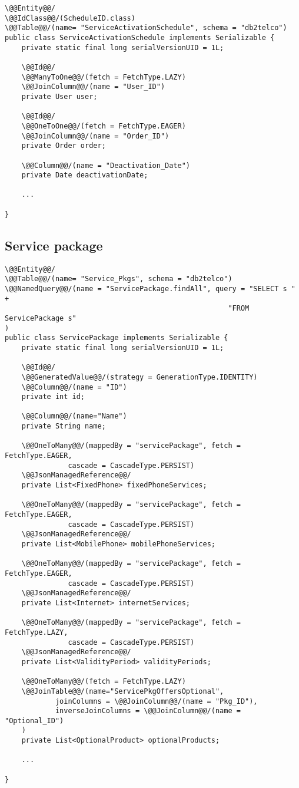 \begin{lstlisting}[style = JPA]
\@@Entity@@/
\@@IdClass@@/(ScheduleID.class)
\@@Table@@/(name= "ServiceActivationSchedule", schema = "db2telco")
public class ServiceActivationSchedule implements Serializable {
    private static final long serialVersionUID = 1L;

    \@@Id@@/
    \@@ManyToOne@@/(fetch = FetchType.LAZY)
    \@@JoinColumn@@/(name = "User_ID")
    private User user;

    \@@Id@@/
    \@@OneToOne@@/(fetch = FetchType.EAGER)
    \@@JoinColumn@@/(name = "Order_ID")
    private Order order;

    \@@Column@@/(name = "Deactivation_Date")
    private Date deactivationDate;
    
    ...

}
\end{lstlisting}

\subsection*{Service package}

\begin{lstlisting}[style = JPA]
\@@Entity@@/
\@@Table@@/(name= "Service_Pkgs", schema = "db2telco")
\@@NamedQuery@@/(name = "ServicePackage.findAll", query = "SELECT s " +
                                                     "FROM ServicePackage s"
)
public class ServicePackage implements Serializable {
    private static final long serialVersionUID = 1L;

    \@@Id@@/
    \@@GeneratedValue@@/(strategy = GenerationType.IDENTITY)
    \@@Column@@/(name = "ID")
    private int id;

    \@@Column@@/(name="Name")
    private String name;

    \@@OneToMany@@/(mappedBy = "servicePackage", fetch = FetchType.EAGER, 
               cascade = CascadeType.PERSIST)
    \@@JsonManagedReference@@/
    private List<FixedPhone> fixedPhoneServices;

    \@@OneToMany@@/(mappedBy = "servicePackage", fetch = FetchType.EAGER, 
               cascade = CascadeType.PERSIST)
    \@@JsonManagedReference@@/
    private List<MobilePhone> mobilePhoneServices;

    \@@OneToMany@@/(mappedBy = "servicePackage", fetch = FetchType.EAGER,
               cascade = CascadeType.PERSIST)
    \@@JsonManagedReference@@/
    private List<Internet> internetServices;

    \@@OneToMany@@/(mappedBy = "servicePackage", fetch = FetchType.LAZY,
               cascade = CascadeType.PERSIST)
    \@@JsonManagedReference@@/
    private List<ValidityPeriod> validityPeriods;

    \@@OneToMany@@/(fetch = FetchType.LAZY)
    \@@JoinTable@@/(name="ServicePkgOffersOptional",
            joinColumns = \@@JoinColumn@@/(name = "Pkg_ID"),
            inverseJoinColumns = \@@JoinColumn@@/(name = "Optional_ID")
    )
    private List<OptionalProduct> optionalProducts;
    
    ...

}
\end{lstlisting}

